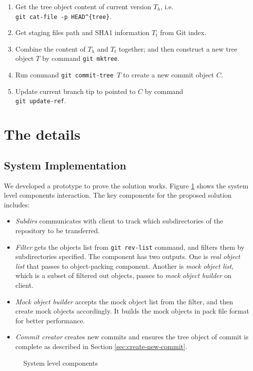 \documentclass[preprint]{sigplanconf}
\begin{document}
\begin{enumerate}
  \item Get the tree object content of current version $T_h$, i.e. \\
        \verb|git cat-file -p HEAD^{tree}|.

  \item Get staging files path and SHA1 information $T_t$ from Git index.

  \item Combine the content of $T_h$ and $T_t$ together; and then construct a
        new tree object $T$ by command \verb|git mktree|.

  \item Run command \verb|git commit-tree |$T$ to create a new commit object
        $C$.

  \item Update current branch tip to pointed to $C$ by command \\
        \verb|git update-ref|.
\end{enumerate}

\section{The details}
\subsection{System Implementation}
We developed a prototype to prove the solution works.
Figure \ref{fig:components} shows the system level components interaction.
The key components for the proposed solution includes:
\begin{itemize}
  \item \emph{Subdirs} communicates with client to track which subdirectories
    of the repository to be transferred.

  \item \emph{Filter} gets the objects list from
    \verb|git rev-list| command, and filters them by subdirectories specified.
    The component has two outputs.
    One is \emph{real object list} that passes to object-packing component.
    Another is \emph{mock object list}, which is a subset of filtered out
    objects, passes to \emph{mock object builder} on client.

  \item \emph{Mock object builder} accepts the mock object list
    from the filter, and then create mock objects accordingly.
    It builds the mock objects in pack file format\cite{packformat} for better
    performance.

  \item \emph{Commit creator} creates new commits and ensures
    the tree object of commit is complete as described in Section
    \ref{sec:create-new-commit}.
\end{itemize}
\begin{figure}[htpb]
  \centering
  
  \caption{System level components}
  \label{fig:components}
\end{figure}
\end{document}

